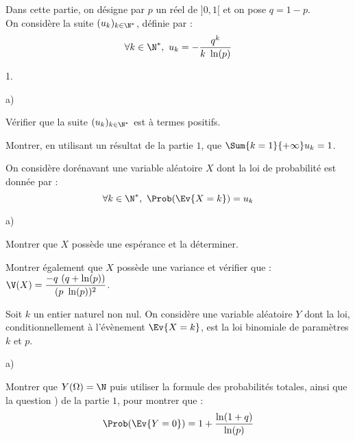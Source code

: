 \noindent
Dans cette partie, on désigne par $p$ un réel de $]0,1[$ et on pose $q
= 1-p$.\\
On considère la suite $(u_k)_{k\in\N^{*}}$, définie par :
\[
\forall k\in\N^*, \ u_k = -\dfrac{q^{k}}{k \ \ln(p)}
\]
\begin{noliste}{1.}
  \setlength{\itemsep}{4mm}
\item
  \begin{noliste}{a)}
    \setlength{\itemsep}{2mm}
  \item Vérifier que la suite $(u_k)_{k\in\N^{*}}$ est à termes
    positifs.

    




  \item Montrer, en utilisant un résultat de la partie $1$, que
    $\Sum{k = 1}{+ \infty} u_k = 1$.

    
  \end{noliste}
  On considère dorénavant une variable aléatoire $X$ dont la loi de
  probabilité est donnée par :
  \[
  \forall k\in\N^{*}, \ \Prob(\Ev{X = k}) = u_k
  \]
  
\item
  \begin{noliste}{a)}
    \setlength{\itemsep}{2mm}
  \item Montrer que $X$ possède une espérance et la déterminer.

    




  \item Montrer également que $X$ possède une variance et vérifier que
    : $\V(X) = \dfrac{-q \ (q + \ln(p))}{(p \ \ln(p))^{2}}$.

    
  \end{noliste}

\item Soit $k$ un entier naturel non nul. On considère une variable
  aléatoire $Y$ dont la loi, conditionnellement à l'évènement $\Ev{X =
    k}$, est la loi binomiale de paramètres $k$ et $p$.

  \begin{noliste}{a)}
    \setlength{\itemsep}{2mm}
  \item Montrer que $Y(\Omega) = \N$ puis utiliser la formule des
    probabilités totales, ainsi que la question ) de la partie
    $1$, pour montrer que :
    \[
    \Prob(\Ev{Y = 0}) = 1 + \dfrac{\ln(1 + q)}{\ln(p)}
    \]





\end{noliste}
\end{noliste}
